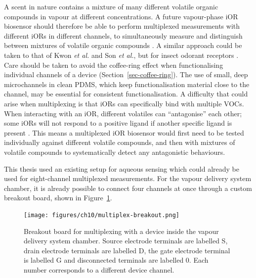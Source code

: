 \documentclass[
  a4paper,
]{scrbook}
\begin{document}
A scent in nature contains a mixture of many different volatile organic
compounds in vapour at different concentrations. A future vapour-phase
iOR biosensor should therefore be able to perform multiplexed
measurements with different iORs in different channels, to
simultaneously measure and distinguish between mixtures of volatile
organic compounds \autocite{Kwon2015,Bachtiar2016,Hurot2020,Hirata2021}.
A similar approach could be taken to that of Kwon \emph{et al.} and Son
\emph{et al.}, but for insect odorant receptors
\autocite{Kwon2015,Son2017}. Care should be taken to avoid the
coffee-ring effect when functionalising individual channels of a device
(Section~\ref{sec-coffee-ring}). The use of small, deep microchannels in
clean PDMS, which keep functionalisation material close to the channel,
may be essential for consistent functionalisation. A difficulty that
could arise when multiplexing is that iORs can specifically bind with
multiple VOCs. When interacting with an iOR, different volatiles can
``antagonise'' each other; some iORs will not respond to a positive
ligand if another specific ligand is present
\autocite{Kwon2015,Son2017,Munch2016,Hirata2021}. This means a
multiplexed iOR biosensor would first need to be tested individually
against different volatile compounds, and then with mixtures of volatile
compounds to systematically detect any antagonistic behaviours.

This thesis used an existing setup for aqueous sensing which could
already be used for eight-channel multiplexed measurements. For the
vapour delivery system chamber, it is already possible to connect four
channels at once through a custom breakout board, shown in
Figure~\ref{fig-vapour-sensor-breakout}.

\begin{figure}

{\centering \texttt{[image: figures/ch10/multiplex-breakout.png]}

}

\caption[Breakout board for multiplexing with a device inside the vapour
delivery system chamber.]{\label{fig-vapour-sensor-breakout}Breakout
board for multiplexing with a device inside the vapour delivery system
chamber. Source electrode terminals are labelled S, drain electrode
terminals are labelled D, the gate electrode terminal is labelled G and
disconnected terminals are labelled 0. Each number corresponds to a
different device channel.}

\end{figure}
\end{document}
